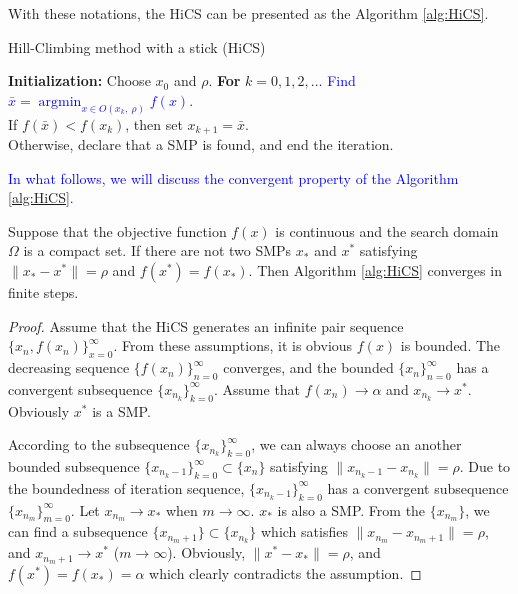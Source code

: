 \documentclass[mathpazo]{csam}
\DeclareMathOperator*{\argmin}{\mathrm{argmin}}
\theoremstyle{remark}
\begin{document}
With these notations, the HiCS can be presented
as the Algorithm \ref{alg:HiCS}.
\begin{algorithm}[H]
	\caption{Hill-Climbing method with a stick (HiCS)}
	\label{alg:HiCS}
\begin{algorithmic}[1]
	\STATE \textbf{Initialization:} Choose $x_0$ and $\rho$.
	\STATE \textbf{For} $k=0,1,2,\dots$
	\STATE \hspace{0.5cm} 
	\textcolor{blue}{Find $\bar{x}=\argmin_{x\in O(x_k,~ \rho)} f(x)$. }
			\\
	\STATE \hspace{0.5cm} If $f(\bar x)<f(x_k)$, then set $x_{k+1}= \bar{x}$.
		  \\
	\STATE \hspace{0.5cm} Otherwise, declare that 
		   a SMP is found, and end the iteration.
\end{algorithmic}
\end{algorithm}
\textcolor{blue}{ 
In what follows, we will discuss the convergent property of the Algorithm
\ref{alg:HiCS}.
}
\begin{theorem}
	\label{thm:fsc}
	Suppose that the objective function $f(x)$ is continuous and the
	search domain $\Omega$ is a compact set.
	If there are not two SMPs $x_*$ and $x^*$ satisfying 
	$\|x_*-x^*\|=\rho$ and $f(x^*)=f(x_*)$.
	Then Algorithm \ref{alg:HiCS} converges in finite steps.
\end{theorem}
\begin{proof}
	Assume that the HiCS generates an infinite pair sequence
	$\{x_n, f(x_n)\}_{x=0}^{\infty}$. From these assumptions,
	it is obvious $f(x)$ is bounded. The decreasing sequence
	$\{f(x_n)\}_{n=0}^\infty$ converges, and the bounded
	$\{x_n\}_{n=0}^\infty$ has a convergent subsequence 
	$\{x_{n_k}\}_{k=0}^\infty$. Assume that $f(x_n)\rightarrow
	\alpha$ and $x_{n_k}\rightarrow x^*$. Obviously $x^*$ is a SMP.
	
	According to the subsequence
	$\{x_{n_k}\}_{k=0}^\infty$, we can always choose an another
	bounded subsequence $\{x_{n_k -1}\}_{k=0}^\infty \subset
	\{x_n\}$ satisfying $\|x_{n_k - 1}-x_{n_k}\|=\rho$. 
	Due to the boundedness of iteration
	sequence, $\{x_{n_k-1}\}_{k=0}^\infty$ has a convergent
	subsequence $\{x_{n_{m}}\}_{m=0}^\infty$. Let $x_{n_m}
	\rightarrow x_*$ when $m\rightarrow \infty$. $x_*$ is also a SMP.
	From the $\{x_{n_m}\}$, we can find a subsequence
	$\{x_{n_{m}+1}\}\subset \{x_{n_k}\}$ which satisfies
	$\|x_{n_m}-x_{n_{m}+1}\|=\rho$, and $x_{n_{m}+1}\rightarrow x^*$
	($m\rightarrow \infty$).
	Obviously, $\|x^*-x_*\|=\rho$, and $f(x^*)=f(x_*)=\alpha$ 
	which clearly contradicts the assumption.
\end{proof}
\end{document}
